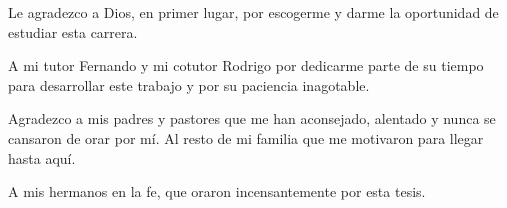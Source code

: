 \begin{acknowledgements}

    Le agradezco a Dios, en primer lugar, por escogerme y darme la oportunidad de estudiar esta carrera.

    A mi tutor Fernando y mi cotutor Rodrigo por dedicarme parte de su tiempo para desarrollar este trabajo y por su paciencia inagotable.

    Agradezco a mis padres y pastores que me han aconsejado, alentado y nunca se cansaron de orar por mí. Al resto de mi familia que me motivaron para llegar hasta aquí.
    
    A mis hermanos en la fe, que oraron incensantemente por esta tesis.

\end{acknowledgements}
